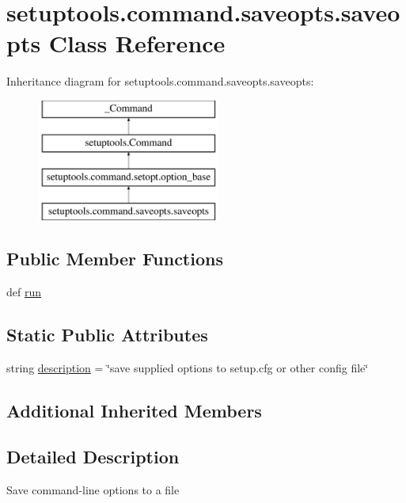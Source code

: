 \hypertarget{classsetuptools_1_1command_1_1saveopts_1_1saveopts}{}\section{setuptools.\+command.\+saveopts.\+saveopts Class Reference}
\label{classsetuptools_1_1command_1_1saveopts_1_1saveopts}
Inheritance diagram for setuptools.\+command.\+saveopts.\+saveopts\+:\begin{figure}[H]
\begin{center}
\leavevmode
\includegraphics[height=4.000000cm]{classsetuptools_1_1command_1_1saveopts_1_1saveopts}
\end{center}
\end{figure}
\subsection*{Public Member Functions}
\begin{DoxyCompactItemize}
\item 
def \hyperlink{classsetuptools_1_1command_1_1saveopts_1_1saveopts_a358a6c52f504948892d2691f2b3a4e36}{run}
\end{DoxyCompactItemize}
\subsection*{Static Public Attributes}
\begin{DoxyCompactItemize}
\item 
string \hyperlink{classsetuptools_1_1command_1_1saveopts_1_1saveopts_ab7e9d5c48646b1ba4c08dec464591cd3}{description} = \char`\"{}save supplied options to setup.\+cfg or other config file\char`\"{}
\end{DoxyCompactItemize}
\subsection*{Additional Inherited Members}


\subsection{Detailed Description}
\begin{DoxyVerb}Save command-line options to a file\end{DoxyVerb}
 

